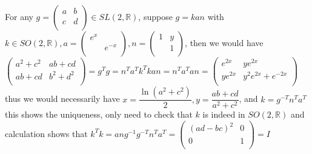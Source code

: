 \documentclass[main]{subfiles}
\newcommand{\<}[1]{\langle #1 \rangle}
\begin{document}
\begin{exercise}
\begin{enumerate}[label=(\alph*),leftmargin=*]

\end{enumerate}
\end{exercise}

For any $g=
\left( {\begin{array}{cc}
a & b \\
c & d \\
\end{array} } \right)\in SL(2,\mathbb R)$, suppose $g=kan$ with $k\in SO(2,\mathbb R), a=\left( {\begin{array}{cc}
e^{x} &  \\
 & e^{-x} \\
\end{array} } \right), n=\left( {\begin{array}{cc}
1 & y \\
 & 1 \\
\end{array} } \right)$, then we would have $\left( {\begin{array}{cc}
a^2+c^2 & ab+cd \\
ab+cd & b^2+d^2 \\
\end{array} } \right)=g^Tg=n^Ta^Tk^Tkan=n^Ta^Tan=\left( {\begin{array}{cc}
e^{2x} & ye^{2x} \\
ye^{2x} & y^2e^{2x}+e^{-2x} \\
\end{array} } \right)$ thus we would necessarily have $x=\dfrac{\ln(a^2+c^2)}{2}, y=\dfrac{ab+cd}{a^2+c^2}$, and $k=g^{-T}n^Ta^T$ this shows the uniqueness, only need to check that $k$ is indeed in $SO(2,\mathbb R)$ and calculation shows that $k^Tk=ang^{-1}g^{-T}n^Ta^T=\left( {\begin{array}{cc}
(ad-bc)^2 & 0 \\
0 & 1 \\
\end{array} } \right)=I$ \par

\begin{exercise}
\begin{enumerate}[label=(\alph*),leftmargin=*]

\end{enumerate}
\end{exercise}
\end{document}
